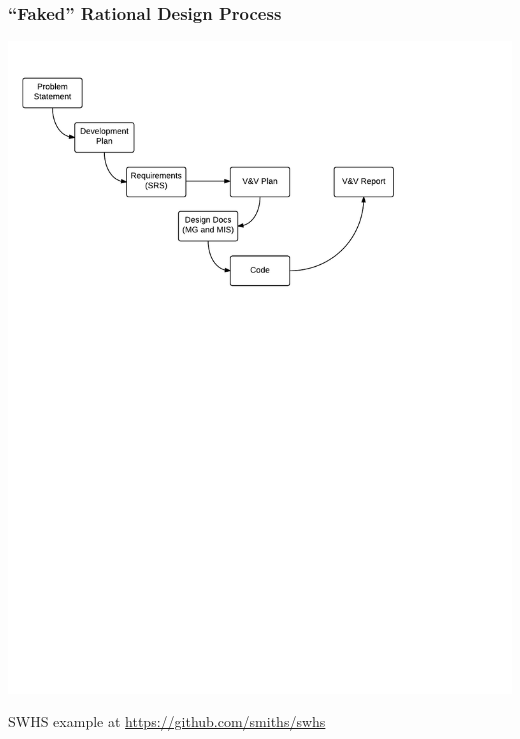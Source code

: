 \documentclass{beamer}
\begin{document}

\begin{frame}

\frametitle{``Faked'' Rational Design Process}

\begin{center}
\includegraphics[scale=0.6]{OverviewOfProcess.pdf}
\end{center}

SWHS example at
\href{https://github.com/smiths/swhs}{https://github.com/smiths/swhs}

\end{frame}




\end{document}
